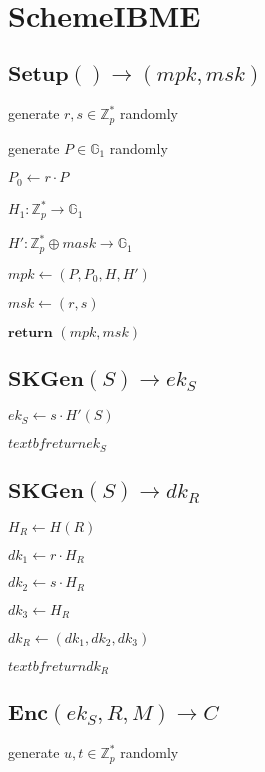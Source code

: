 \documentclass[a4paper]{article}
\begin{document}
\section{SchemeIBME}

\subsection{$\textbf{Setup}() \rightarrow (\textit{mpk}, \textit{msk})$}

generate $r, s \in \mathbb{Z}_p^*$ randomly

generate $P \in \mathbb{G}_1$ randomly

$P_0 \gets r \cdot P$

$H_1:\mathbb{Z}_p^* \rightarrow \mathbb{G}_1$

$H':\mathbb{Z}_p^* \oplus \textit{mask} \rightarrow \mathbb{G}_1$

$\textit{mpk} \gets (P, P_0, H, H')$

$\textit{msk} \gets (r, s)$

$\textbf{return }(\textit{mpk}, \textit{msk})$

\subsection{$\textbf{SKGen}(S) \rightarrow \textit{ek}_S$}

$\textit{ek}_S \gets s \cdot H'(S)$

$textbf{return }\textit{ek}_S$

\subsection{$\textbf{SKGen}(S) \rightarrow \textit{dk}_R$}

$H_R \gets H(R)$

$\textit{dk}_1 \gets r \cdot H_R$

$\textit{dk}_2 \gets s \cdot H_R$

$\textit{dk}_3 \gets H_R$

$\textit{dk}_R \gets (\textit{dk}_1, \textit{dk}_2, \textit{dk}_3)$

$textbf{return }\textit{dk}_R$

\subsection{$\textbf{Enc}(\textit{ek}_S, R, M) \rightarrow C$}

generate $u, t \in \mathbb{Z}_p^*$ randomly
\end{document}
